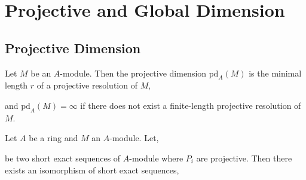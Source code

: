 \documentclass[12pt]{article}
\begin{document}
\section{Projective and Global Dimension}

\subsection{Projective Dimension}

\newcommand{\pd}[2]{\mathrm{pd}_{#1} \left( #2 \right)}

\begin{defn}
Let $M$ be an $A$-module. Then the projective dimension $\pd{A}{M}$ is the minimal length $r$ of a projective resolution of $M$,
\begin{center}
\end{center}
and $\pd{A}{M} = \infty$ if there does not exist a finite-length projective resolution of $M$.
\end{defn}

\begin{lemma}
Let $A$ be a ring and $M$ an $A$-module. Let,
\begin{center}
\end{center}
be two short exact sequences of $A$-module where $P_i$ are projective. Then there exists an isomorphism of short exact sequences,
\begin{center}
\end{center}
\end{lemma}
\end{document}

